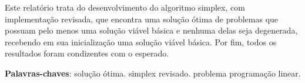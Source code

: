 \documentclass[
	12pt,				%
	openright,			%
	oneside,			%
	a4paper,			%
	english,			%
	french,				%
	spanish,			%
	brazil,				%
	]{abntex2}
\begin{document}
\frenchspacing 

\pretextual

\imprimircapa




\setlength{\absparsep}{18pt} %
\begin{resumo}
Este relatório trata do desenvolvimento do algoritmo simplex, com implementação revisada, que encontra uma solução ótima de problemas que possuam pelo menos uma solução viável básica e nenhuma delas seja degenerada, recebendo em sua inicialização uma solução viável básica. Por fim, todos os resultados foram condizentes com o esperado.

 \noindent
 \textbf{Palavras-chaves}: solução ótima. simplex revisado. problema programação linear.
\end{resumo}

%
%
%
%
\tableofcontents*
\cleardoublepage
%
%
\end{document}
